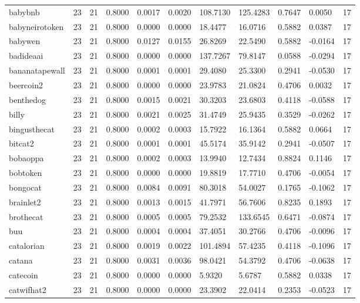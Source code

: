 \begin{table}[htbp]
\begin{tabular}{lllllllllll}
babybnb & 23 & 21 & 0.8000 & 0.0017 & 0.0020 & 108.7130 & 125.4283 & 0.7647 & 0.0050 & 17 \\
babyneirotoken & 23 & 21 & 0.8000 & 0.0000 & 0.0000 & 18.4477 & 16.0716 & 0.5882 & 0.0387 & 17 \\
babywen & 23 & 21 & 0.8000 & 0.0127 & 0.0155 & 26.8269 & 22.5490 & 0.5882 & -0.0164 & 17 \\
badideaai & 23 & 21 & 0.8000 & 0.0000 & 0.0000 & 137.7267 & 79.8147 & 0.0588 & -0.0294 & 17 \\
bananatapewall & 23 & 21 & 0.8000 & 0.0001 & 0.0001 & 29.4080 & 25.3300 & 0.2941 & -0.0530 & 17 \\
beercoin2 & 23 & 21 & 0.8000 & 0.0000 & 0.0000 & 23.9783 & 21.0824 & 0.4706 & 0.0032 & 17 \\
benthedog & 23 & 21 & 0.8000 & 0.0015 & 0.0021 & 30.3203 & 23.6803 & 0.4118 & -0.0588 & 17 \\
billy & 23 & 21 & 0.8000 & 0.0021 & 0.0025 & 31.4749 & 25.9435 & 0.3529 & -0.0262 & 17 \\
bingusthecat & 23 & 21 & 0.8000 & 0.0002 & 0.0003 & 15.7922 & 16.1364 & 0.5882 & 0.0664 & 17 \\
bitcat2 & 23 & 21 & 0.8000 & 0.0001 & 0.0001 & 45.5174 & 35.9142 & 0.2941 & -0.0507 & 17 \\
bobaoppa & 23 & 21 & 0.8000 & 0.0002 & 0.0003 & 13.9940 & 12.7434 & 0.8824 & 0.1146 & 17 \\
bobtoken & 23 & 21 & 0.8000 & 0.0000 & 0.0000 & 19.8819 & 17.7710 & 0.4706 & -0.0054 & 17 \\
bongocat & 23 & 21 & 0.8000 & 0.0084 & 0.0091 & 80.3018 & 54.0027 & 0.1765 & -0.1062 & 17 \\
brainlet2 & 23 & 21 & 0.8000 & 0.0013 & 0.0015 & 41.7971 & 56.7606 & 0.8235 & 0.1893 & 17 \\
brothecat & 23 & 21 & 0.8000 & 0.0005 & 0.0005 & 79.2532 & 133.6545 & 0.6471 & -0.0874 & 17 \\
buu & 23 & 21 & 0.8000 & 0.0004 & 0.0004 & 37.4051 & 30.2766 & 0.4706 & -0.0096 & 17 \\
catalorian & 23 & 21 & 0.8000 & 0.0019 & 0.0022 & 101.4894 & 57.4235 & 0.4118 & -0.1096 & 17 \\
catana & 23 & 21 & 0.8000 & 0.0031 & 0.0036 & 98.0421 & 54.3792 & 0.4706 & -0.0638 & 17 \\
catecoin & 23 & 21 & 0.8000 & 0.0000 & 0.0000 & 5.9320 & 5.6787 & 0.5882 & 0.0338 & 17 \\
catwifhat2 & 23 & 21 & 0.8000 & 0.0000 & 0.0000 & 23.3902 & 22.0414 & 0.2353 & -0.0523 & 17 \\

\end{tabular}
\end{table}
